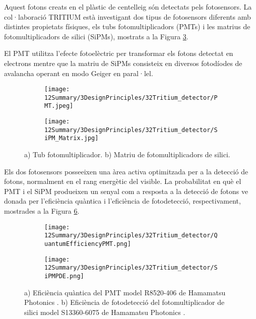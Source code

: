 Aquest fotons creats en el plàstic de centelleig són detectats pels fotosensors. La col·laboració TRITIUM està investigant dos tipus de fotosensors diferents amb distintes propietats físiques, els tubs fotomultiplicadors (PMTs) i les matrius de fotomultiplicadors de silici (SiPMs), mostrats a la Figura \ref{fig:Fotosensors}.

El PMT utilitza l'efecte fotoelèctric per transformar els fotons detectat en electrons mentre que la matriu de SiPMs consisteix en diversos fotodíodes de avalancha operant en modo Geiger en paral·lel.

\begin{figure}[htpb]
\centering
    \begin{subfigure}[b]{0.4\textwidth}
    \centering
    \texttt{[image: 12Summary/3DesignPrinciples/32Tritium\_detector/PMT.jpeg]}  
    \caption{\label{subfig:PMT}}
    \end{subfigure}
    \hfill
    \begin{subfigure}[b]{0.4\textwidth}
    \centering
    \texttt{[image: 12Summary/3DesignPrinciples/32Tritium\_detector/SiPM\_Matrix.jpg]}  
    \caption{\label{subfig:SiPM}}
    \end{subfigure}
 \caption{a) Tub fotomultiplicador. b) Matriu de fotomultiplicadors de silici.}
 \label{fig:Fotosensors}
\end{figure}

Els dos fotosensors posseeixen una àrea activa optimitzada per a la detecció de fotons, normalment en el rang energètic del visible. La probabilitat en què el PMT i el SiPM produeixen un senyal com a resposta a la detecció de fotons ve donada per l'eficiència quàntica i l'eficiència de fotodetecció, respectivament, mostrades a la Figura \ref{fig:EficienciaFotosensors}. 

\begin{figure}[htpb]
\centering
    \begin{subfigure}[b]{0.45\textwidth}
    \centering
    \texttt{[image: 12Summary/3DesignPrinciples/32Tritium\_detector/QuantumEfficiencyPMT.png]}  
    \caption{\label{subfig:QEPMT}}
    \end{subfigure}
    \hfill
    \begin{subfigure}[b]{0.45\textwidth}
    \centering
    \texttt{[image: 12Summary/3DesignPrinciples/32Tritium\_detector/SiPMPDE.png]}  
    \caption{\label{subfig:PDESiPM}}
    \end{subfigure}
 \caption{a) Eficiència quàntica del PMT model R8520-406 de Hamamatsu Photonics \cite{DataSheetPMTs}. b) Eficiència de fotodetecció del fotomultiplicador de silici model S13360-6075 de Hamamatsu Photonics \cite{DataSheetHammamatsu_1_SiPM_1375}.}
 \label{fig:EficienciaFotosensors}
\end{figure}


